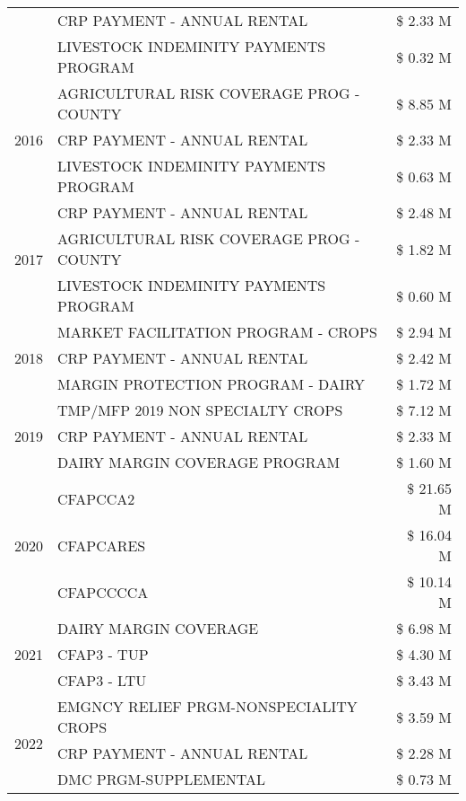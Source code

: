 \begin{tabular}{llr}
 & CRP PAYMENT - ANNUAL RENTAL & \$ 2.33 M \\
 & LIVESTOCK INDEMINITY PAYMENTS PROGRAM & \$ 0.32 M \\
\cline{1-3}
\multirow[t]{3}{*}{2016} & AGRICULTURAL RISK COVERAGE PROG - COUNTY & \$ 8.85 M \\
 & CRP PAYMENT - ANNUAL RENTAL & \$ 2.33 M \\
 & LIVESTOCK INDEMINITY PAYMENTS PROGRAM & \$ 0.63 M \\
\cline{1-3}
\multirow[t]{3}{*}{2017} & CRP PAYMENT - ANNUAL RENTAL & \$ 2.48 M \\
 & AGRICULTURAL RISK COVERAGE PROG - COUNTY & \$ 1.82 M \\
 & LIVESTOCK INDEMINITY PAYMENTS PROGRAM & \$ 0.60 M \\
\cline{1-3}
\multirow[t]{3}{*}{2018} & MARKET FACILITATION PROGRAM - CROPS & \$ 2.94 M \\
 & CRP PAYMENT - ANNUAL RENTAL & \$ 2.42 M \\
 & MARGIN PROTECTION PROGRAM - DAIRY & \$ 1.72 M \\
\cline{1-3}
\multirow[t]{3}{*}{2019} & TMP/MFP 2019 NON SPECIALTY CROPS & \$ 7.12 M \\
 & CRP PAYMENT - ANNUAL RENTAL & \$ 2.33 M \\
 & DAIRY MARGIN COVERAGE PROGRAM & \$ 1.60 M \\
\cline{1-3}
\multirow[t]{3}{*}{2020} & CFAPCCA2 & \$ 21.65 M \\
 & CFAPCARES & \$ 16.04 M \\
 & CFAPCCCCA & \$ 10.14 M \\
\cline{1-3}
\multirow[t]{3}{*}{2021} & DAIRY MARGIN COVERAGE & \$ 6.98 M \\
 & CFAP3 - TUP & \$ 4.30 M \\
 & CFAP3 - LTU & \$ 3.43 M \\
\cline{1-3}
\multirow[t]{3}{*}{2022} & EMGNCY RELIEF PRGM-NONSPECIALITY CROPS & \$ 3.59 M \\
 & CRP PAYMENT - ANNUAL RENTAL & \$ 2.28 M \\
 & DMC PRGM-SUPPLEMENTAL & \$ 0.73 M \\
\cline{1-3}
\bottomrule
\end{tabular}
